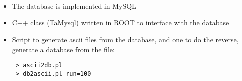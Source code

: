 \renewcommand{\slidefonts}{\transf}
%
%
%
\begin{slide*}

\begin{center}
\begin{shadowenv}[.45\slideheight]
\transf

 \\ 
{\ } \\
\end{shadowenv}
\end{center}

\begin{center}
\normalsize
{} \\
\vspace*{0.5cm}

\end{center}

{\Large 

\begin{itemize}
\item  The database is implemented in MySQL

{}

\item C++ class (TaMysql) written in ROOT to 
interface with the database

{}

\item Script to generate ascii files from the database, and one
to do the reverse, generate a database from the file: 

\begin{verbatim}
 > ascii2db.pl 
 > db2ascii.pl run=100
\end{verbatim}

\end{itemize}
}


\end{slide*}

